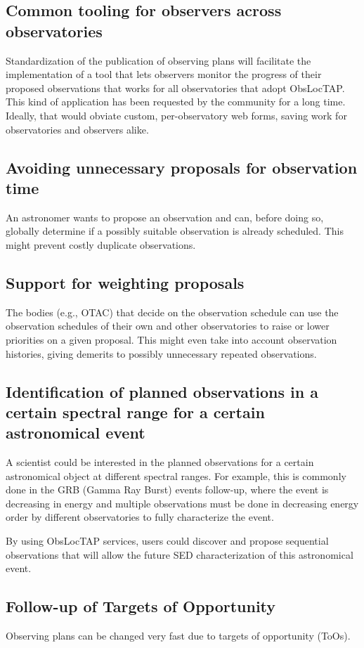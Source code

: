 \documentclass[11pt,a4paper]{ivoa}
\begin{document}
\subsection{Common tooling for observers across observatories}
Standardization of the publication of observing plans will facilitate the
implementation of a tool that lets observers monitor the progress of their
proposed observations that works for all observatories that adopt ObsLocTAP.
This kind of application has been requested by the community for a long time.
Ideally, that would obviate custom, per-observatory web forms, saving work for
observatories and observers alike.

\subsection{Avoiding unnecessary proposals for observation time}
An astronomer wants to propose an observation and can, before doing so,
globally determine if a possibly suitable observation is already scheduled.
This might prevent costly duplicate observations.

\subsection{Support for weighting proposals}
The bodies (e.g., OTAC) that decide on the observation schedule can use the
observation schedules of their own and other observatories to raise or lower
priorities on a given proposal. This might even take into account observation
histories, giving demerits to possibly unnecessary repeated observations.

\subsection{Identification of planned observations in a certain spectral range
for a certain astronomical event}
A scientist could be interested in the planned observations for a certain
astronomical object at different spectral ranges. For example, this is commonly
done in the GRB (Gamma Ray Burst) events follow-up, where the event is
decreasing in energy and multiple observations must be done in decreasing energy
order by different observatories to fully characterize the event.

By using ObsLocTAP services, users could discover and propose sequential
observations that will allow the future SED characterization of this
astronomical event.

\subsection{Follow-up of Targets of Opportunity}
Observing plans can be changed very fast due to targets of opportunity (ToOs).
\end{document}
